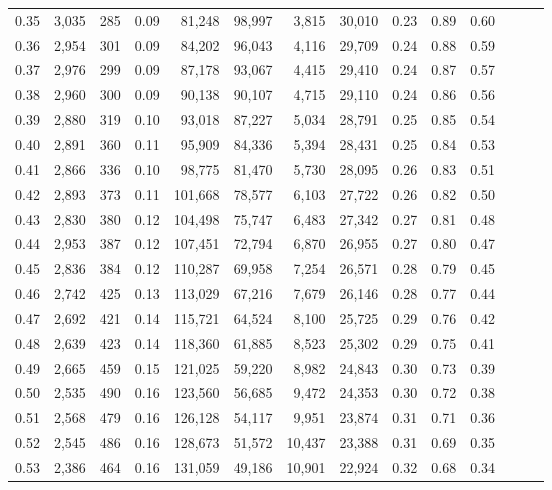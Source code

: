 \begin{tabular}{rrrrrrrrrrrrrr}
0.35 &  3,035 &    285 &  0.09 &   81,248 &   98,997 &   3,815 &  30,010 &  0.23 &  0.89 &      0.60 \\
0.36 &  2,954 &    301 &  0.09 &   84,202 &   96,043 &   4,116 &  29,709 &  0.24 &  0.88 &      0.59 \\
0.37 &  2,976 &    299 &  0.09 &   87,178 &   93,067 &   4,415 &  29,410 &  0.24 &  0.87 &      0.57 \\
0.38 &  2,960 &    300 &  0.09 &   90,138 &   90,107 &   4,715 &  29,110 &  0.24 &  0.86 &      0.56 \\
0.39 &  2,880 &    319 &  0.10 &   93,018 &   87,227 &   5,034 &  28,791 &  0.25 &  0.85 &      0.54 \\
0.40 &  2,891 &    360 &  0.11 &   95,909 &   84,336 &   5,394 &  28,431 &  0.25 &  0.84 &      0.53 \\
0.41 &  2,866 &    336 &  0.10 &   98,775 &   81,470 &   5,730 &  28,095 &  0.26 &  0.83 &      0.51 \\
0.42 &  2,893 &    373 &  0.11 &  101,668 &   78,577 &   6,103 &  27,722 &  0.26 &  0.82 &      0.50 \\
0.43 &  2,830 &    380 &  0.12 &  104,498 &   75,747 &   6,483 &  27,342 &  0.27 &  0.81 &      0.48 \\
0.44 &  2,953 &    387 &  0.12 &  107,451 &   72,794 &   6,870 &  26,955 &  0.27 &  0.80 &      0.47 \\
0.45 &  2,836 &    384 &  0.12 &  110,287 &   69,958 &   7,254 &  26,571 &  0.28 &  0.79 &      0.45 \\
0.46 &  2,742 &    425 &  0.13 &  113,029 &   67,216 &   7,679 &  26,146 &  0.28 &  0.77 &      0.44 \\
0.47 &  2,692 &    421 &  0.14 &  115,721 &   64,524 &   8,100 &  25,725 &  0.29 &  0.76 &      0.42 \\
0.48 &  2,639 &    423 &  0.14 &  118,360 &   61,885 &   8,523 &  25,302 &  0.29 &  0.75 &      0.41 \\
0.49 &  2,665 &    459 &  0.15 &  121,025 &   59,220 &   8,982 &  24,843 &  0.30 &  0.73 &      0.39 \\
0.50 &  2,535 &    490 &  0.16 &  123,560 &   56,685 &   9,472 &  24,353 &  0.30 &  0.72 &      0.38 \\
0.51 &  2,568 &    479 &  0.16 &  126,128 &   54,117 &   9,951 &  23,874 &  0.31 &  0.71 &      0.36 \\
0.52 &  2,545 &    486 &  0.16 &  128,673 &   51,572 &  10,437 &  23,388 &  0.31 &  0.69 &      0.35 \\
0.53 &  2,386 &    464 &  0.16 &  131,059 &   49,186 &  10,901 &  22,924 &  0.32 &  0.68 &      0.34 \\

\end{tabular}
